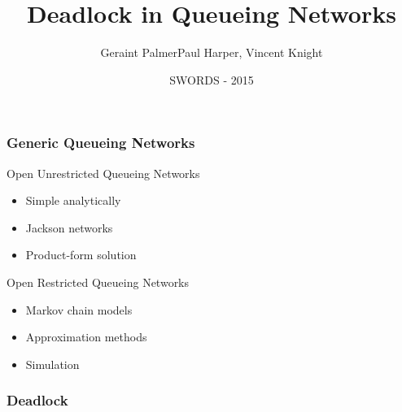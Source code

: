 \documentclass[xcolor={table}]{beamer}
\title
{Deadlock in Queueing Networks}
\author{Geraint Palmer\newline \scriptsize{Paul Harper, Vincent Knight}}
\date{SWORDS - 2015}
\begin{document}
\frame{\titlepage}


\begin{frame}
  \frametitle{Generic Queueing Networks}
  \begin{block}{Open Unrestricted Queueing Networks}
    \begin{itemize}
      \item Simple analytically
      \item Jackson networks
      \item Product-form solution
    \end{itemize}
  \end{block}
  \begin{block}{Open Restricted Queueing Networks}
    \begin{itemize}
      \item Markov chain models
      \item Approximation methods
      \item Simulation
    \end{itemize}
  \end{block}
\end{frame}


\begin{frame}
    \frametitle{Deadlock}
    \begin{figure}
    
    \end{figure}
\end{frame}

\begin{frame}
    \begin{figure}
    
    \end{figure}
\end{frame}

%         
%         
\end{document}
